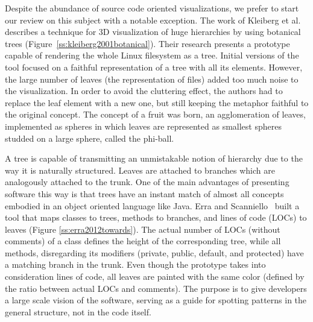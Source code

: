Despite the abundance of source code oriented visualizations, we prefer to start
our review on this subject with a notable exception. The work of Kleiberg et
al.~\cite{kleiberg2001botanical} describes a technique for 3D visualization of
huge hierarchies by using botanical trees
(Figure~\ref{ss:kleiberg2001botanical}). Their research presents a prototype
capable of rendering the whole Linux filesystem as a tree.
Initial versions of the tool focused on a faithful representation of a tree with
all its elements.
However, the large number of leaves (the representation of files) added too much
noise to the visualization. In order to avoid the cluttering effect, the authors
had to replace the leaf element with a new one, but still keeping the metaphor
faithful to the original concept. The concept of a fruit was born, an
agglomeration of leaves, implemented as spheres in which leaves are represented
as smallest spheres studded on a large sphere, called the phi-ball.

A tree is capable of transmitting an unmistakable notion of hierarchy due to the
way it is naturally structured. Leaves are attached to branches which are
analogously attached to the trunk.
One of the main advantages of presenting software this way is that trees have an
instant match of almost all concepts embodied in an object oriented language
like Java. Erra and Scanniello~\cite{erra2012towards} built a tool that maps classes to trees,
methods to branches, and lines of code (LOCs) to leaves
(Figure \ref{ss:erra2012towards}). The
actual number of LOCs (without comments) of a class defines the height of the
corresponding tree, while all methods, disregarding its modifiers (private, public, default, and protected) have a matching branch in the trunk. Even though
the prototype takes into consideration lines of code, all leaves are painted
with the same color (defined by the ratio between actual LOCs and comments). The
purpose is to give developers a large scale vision of the software, serving as a
guide for spotting patterns in the general structure, not in the code itself.

